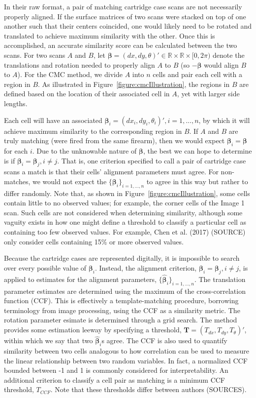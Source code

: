 In their raw format, a pair of matching cartridge case scans are not necessarily properly aligned. If the surface matrices of two scans were stacked on top of one another such that their centers coincided, one would likely need to be rotated and translated to achieve maximum similarity with the other. Once this is accomplished, an accurate similarity score can be calculated between the two scans. For two scans $A$ and $B$, let $\pmb{\beta} = (dx, dy, \theta)' \in \mathbb{R} \times \mathbb{R} \times [0,2\pi)$ denote the translations and rotation needed to properly align $A$ to $B$ (so $-\pmb{\beta}$ would align $B$ to $A$). For the CMC method, we divide $A$ into $n$ cells and pair each cell with a region in $B$. As illustrated in Figure~\ref{figure:cmcIllustration}, the regions in $B$ are defined based on the location of their associated cell in $A$, yet with larger side lengths.

Each cell will have an associated $\pmb{\beta}_i = (dx_i, dy_i, \theta_i)', i = 1,...,n$, by which it will achieve maximum similarity to the corresponding region in $B$. If $A$ and $B$ are truly matching (were fired from the same firearm), then we would expect $\pmb{\beta}_i = \pmb{\beta}$ for each $i$. Due to the unknowable nature of $\pmb{\beta}$, the best we can hope to determine is if $\pmb{\beta}_i = \pmb{\beta}_j, i \neq j$. That is, one criterion specified to call a pair of cartridge case scans a match is that their cells' alignment parameters must agree. For non-matches, we would not expect the $
\{\pmb{\beta}_i\}_{i = 1,...,n}$ to agree in this way but rather to differ randomly. Note that, as shown in Figure~\ref{figure:cmcIllustration}, some cells contain little to no observed values; for example, the corner cells of the Image 1 scan. Such cells are not considered when determining similarity, although some vaguity exists in how one might define a threshold to classify a particular cell as containing too few observed values. For example, Chen et al. (2017) (SOURCE) only consider cells containing 15\% or more observed values.

Because the cartridge cases are represented digitally, it is impossible to search over every possible value of $\pmb{\beta}_i$. Instead, the alignment criterion, $\pmb{\beta}_i = \pmb{\beta}_j, i \neq j$, is applied to estimates for the alignment parameters, $\{\hat{\pmb{\beta}}_i\}_{i = 1,...,n}$. The translation parameter estimates are determined using the maximum of the cross-correlation function (CCF). This is effectively a template-matching procedure, borrowing terminology from image processing, using the CCF as a similarity metric. The rotation parameter esimate is determined through a grid search. The method provides some estimation leeway by specifying a threshold, $\pmb{T} = (T_{dx}, T_{dy}, T_\theta)'$, within which we say that two $\hat{\pmb{\beta}}_i$s agree. The CCF is also used to quantify similarity between two cells analogous to how correlation can be used to measure the linear relationship between two random variables. In fact, a normalized CCF bounded between -1 and 1 is commonly considered for interpretability. An additional criterion to classify a cell pair as matching is a minimum CCF threshold, $T_{CCF}$. Note that these thresholds differ between authors (SOURCES).

